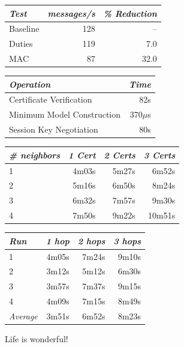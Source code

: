 \centering
  \begin{tabular}{|l|r|r|} \hline
    \textit{Test} \T & \textit{messages/s} & \textit{\% Reduction} \\
    \hline \hline

    Baseline \T & 128 &   -- \\ \hline 
    Duties   \T & 119 &  7.0 \\ \hline
    MAC      \T &  87 & 32.0 \\ \hline
  \end{tabular}
\stopslide


\centering
  \begin{tabular}{|l|r|} \hline
    \textit{Operation} \T & \textit{Time} \\ \hline \hline

    Certificate Verification     \T &  82s \\ \hline 
    Minimum Model Construction   \T & 370$\mu$s \\ \hline
    Session Key Negotiation      \T &  80s\\ \hline
  \end{tabular}
\stopslide


\centering
  \begin{tabular}{|l|r|r|r|} \hline
    \textit{\# neighbors} \T & \textit{1 Cert }
                             & \textit{2 Certs}
                             & \textit{3 Certs} \\ \hline \hline

    1 \T &  4m03s & 5m27s &  6m52s \\ \hline
    2 \T &  5m16s & 6m50s &  8m24s \\ \hline
    3 \T &  6m32s & 7m57s &  9m30s \\ \hline
    4 \T &  7m50s & 9m22s & 10m51s \\ \hline
  \end{tabular}
\stopslide


\centering
  \begin{tabular}{|l|r|r|r|} \hline
    \textit{Run} \T & \textit{1 hop }
                    & \textit{2 hops}
                    & \textit{3 hops} \\ \hline \hline

                   1 \T &  4m05s & 7m24s & 9m10s \\ \hline
                   2 \T &  3m12s & 5m12s & 6m30s \\ \hline
                   3 \T &  3m57s & 7m37s & 9m15s \\ \hline
                   4 \T &  4m09s & 7m15s & 8m49s \\ \hline
    \textit{Average} \T &  3m51s & 6m52s & 8m23s \\ \hline
  \end{tabular}
\stopslide


Life is wonderful!
\stopslide
